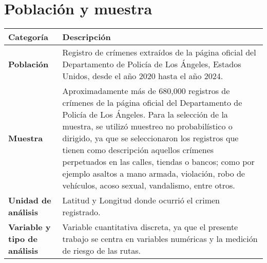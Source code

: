 \section{Población y muestra}
\begin{table}[h!]
	\centering
	\begin{tabular}{|m{4cm}|m{10cm}|}
		\hline
		\textbf{Categoría} & \textbf{Descripción} \\
		\hline
		\textbf{Población} & Registro de crímenes extraídos de la página oficial del Departamento de Policía de Los Ángeles, Estados Unidos, desde el año 2020 hasta el año 2024. \\
		\hline
		\textbf{Muestra} & Aproximadamente más de 680,000 registros de crímenes de la página oficial del Departamento de Policía de Los Ángeles. Para la selección de la muestra, se utilizó muestreo no probabilístico o dirigido, ya que se seleccionaron los registros que tienen como descripción aquellos crímenes perpetuados en las calles, tiendas o bancos; como por ejemplo asaltos a mano armada, violación, robo de vehículos, acoso sexual, vandalismo, entre otros. \\
		\hline
		\textbf{Unidad de análisis} & Latitud y Longitud donde ocurrió el crimen registrado. \\
		\hline
		\textbf{Variable y tipo de análisis} & Variable cuantitativa discreta, ya que el presente trabajo se centra en variables numéricas y la medición de riesgo de las rutas. \\
		\hline
	\end{tabular}
\end{table}

